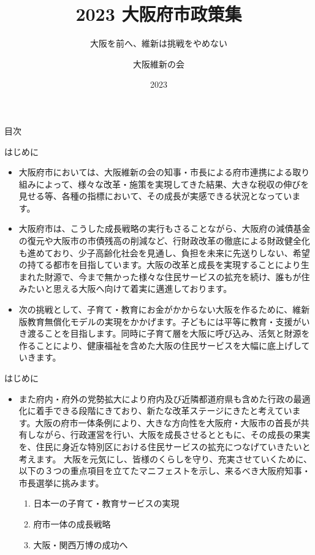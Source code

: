 \documentclass[dvipdfmx]{beamer}
\title{2023 大阪府市政策集}
\subtitle{大阪を前へ、維新は挑戦をやめない}
\author{大阪維新の会}
\date[2023]{2023}
\begin{document}
\maketitle

\begin{frame}{目次}
    \tableofcontents
\end{frame}

\begin{frame}{はじめに}{}
    \begin{footnotesize}
        \begin{itemize}
            \setlength{\itemsep}{2mm}
            \item 大阪府市においては、大阪維新の会の知事・市長による府市連携による取り組みによって、様々な改革・施策を実現してきた結果、大きな税収の伸びを見せる等、各種の指標において、その成長が実感できる状況となっています。
            \item 大阪府市は、こうした成長戦略の実行もさることながら、大阪府の減債基金の復元や大阪市の市債残高の削減など、行財政改革の徹底による財政健全化も進めており、少子高齢化社会を見通し、負担を未来に先送りしない、希望の持てる都市を目指しています。大阪の改革と成長を実現することにより生まれた財源で、今まで無かった様々な住民サービスの拡充を続け、誰もが住みたいと思える大阪へ向けて着実に邁進しております。
            \item 次の挑戦として、子育て・教育にお金がかからない大阪を作るために、維新版教育無償化モデルの実現をかかげます。子どもには平等に教育・支援がいき渡ることを目指します。同時に子育て層を大阪に呼び込み、活気と財源を作ることにより、健康福祉を含めた大阪の住民サービスを大幅に底上げしていきます。 
        \end{itemize}
    \end{footnotesize}
\end{frame}

\begin{frame}{はじめに}{}
    \begin{small}
        \begin{itemize}
            \setlength{\itemsep}{2mm}
            \item また府内・府外の党勢拡大により府内及び近隣都道府県も含めた行政の最適化に着手できる段階にきており、新たな改革ステージにきたと考えています。大阪の府市一体条例により、大きな方向性を大阪府・大阪市の首長が共有しながら、行政運営を行い、大阪を成長させるとともに、その成長の果実を、住民に身近な特別区における住民サービスの拡充につなげていきたいと考えます。 大阪を元気にし、皆様のくらしを守り、充実させていくために、以下の３つの重点項目を立てたマニフェストを示し、来るべき大阪府知事・市長選挙に挑みます。
            \begin{enumerate}
                \item 日本一の子育て・教育サービスの実現
                \item 府市一体の成長戦略
                \item 大阪・関西万博の成功へ
            \end{enumerate}            
        \end{itemize}
    \end{small}
\end{frame}
\end{document}
